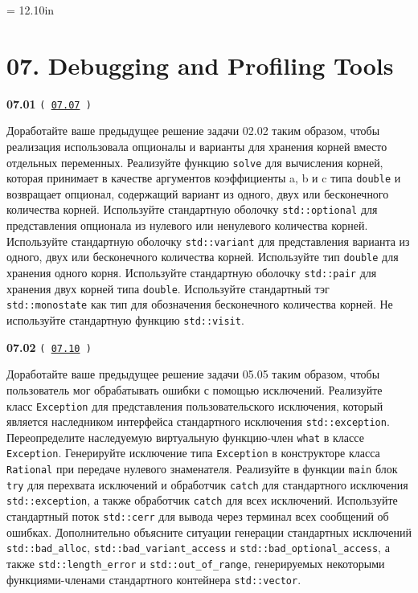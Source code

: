 \documentclass[a4paper,12pt]{article}
\begin{document}
\newpage\thispagestyle{empty}\pdfpageheight = 12.10in\enlargethispage{100in}

\section{07. Debugging and Profiling Tools}

{\large \textbf{07.01} \texttt{(\,\href{https://github.com/i-s-m-mipt/Education/blob/master/projects/examples/source/07.07.cpp}{07.07}\,)}}

\bigskip

Доработайте ваше предыдущее решение задачи 02.02 таким образом, чтобы реализация использовала опционалы и варианты для хранения корней вместо отдельных переменных. Реализуйте функцию \lstinline{solve} для вычисления корней, которая принимает в качестве аргументов коэффициенты a, b и c типа \lstinline{double} и возвращает опционал, содержащий вариант из одного, двух или бесконечного количества корней. Используйте стандартную оболочку \lstinline{std::optional} для представления опционала из нулевого или ненулевого количества корней. Используйте стандартную оболочку \lstinline{std::variant} для представления варианта из одного, двух или бесконечного количества корней. Используйте тип \lstinline{double} для хранения одного корня. Используйте стандартную оболочку \lstinline{std::pair} для хранения двух корней типа \lstinline{double}. Используйте стандартный тэг \lstinline{std::monostate} как тип для обозначения бесконечного количества корней. Не используйте стандартную функцию \lstinline{std::visit}.

\bigskip

{\large \textbf{07.02} \texttt{(\,\href{https://github.com/i-s-m-mipt/Education/blob/master/projects/examples/source/07.10.cpp}{07.10}\,)}}

\bigskip

Доработайте ваше предыдущее решение задачи 05.05 таким образом, чтобы пользователь мог обрабатывать ошибки с помощью исключений. Реализуйте класс \lstinline{Exception} для представления пользовательского исключения, который является наследником интерфейса стандартного исключения \lstinline{std::exception}. Переопределите наследуемую виртуальную функцию-член \lstinline{what} в классе \lstinline{Exception}. Генерируйте исключение типа \lstinline{Exception} в конструкторе класса \lstinline{Rational} при передаче нулевого знаменателя. Реализуйте в функции \lstinline{main} блок \lstinline{try} для перехвата исключений и обработчик \lstinline{catch} для стандартного исключения \lstinline{std::exception}, а также обработчик \lstinline{catch} для всех исключений. Используйте стандартный поток \lstinline{std::cerr} для вывода через терминал всех сообщений об ошибках. Дополнительно объясните ситуации генерации стандартных исключений \lstinline{std::bad_alloc}, \lstinline{std::bad_variant_access} и \lstinline{std::bad_optional_access}, а также \lstinline{std::length_error} и \lstinline{std::out_of_range}, генерируемых некоторыми функциями-членами стандартного контейнера \lstinline{std::vector}.
\end{document}
